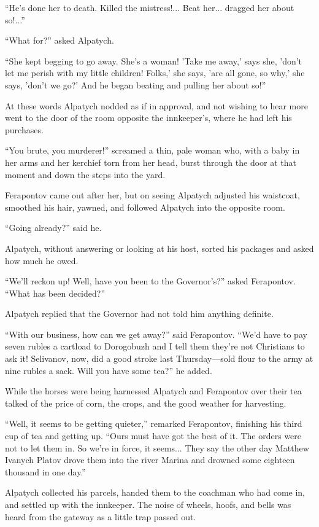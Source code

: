 ``He's done her to death. Killed the mistress!... Beat
her... dragged her about so!...''

``What for?'' asked Alpatych.

``She kept begging to go away. She's a woman! 'Take me away,'
says she, 'don't let me perish with my little children! Folks,'
she says, 'are all gone, so why,' she says, 'don't we go?' And he
began beating and pulling her about so!''

At these words Alpatych nodded as if in approval, and not wishing
to hear more went to the door of the room opposite the
innkeeper's, where he had left his purchases.

``You brute, you murderer!'' screamed a thin, pale woman who,
with a baby in her arms and her kerchief torn from her head,
burst through the door at that moment and down the steps into the
yard.

Ferapontov came out after her, but on seeing Alpatych adjusted
his waistcoat, smoothed his hair, yawned, and followed Alpatych
into the opposite room.

``Going already?'' said he.

Alpatych, without answering or looking at his host, sorted his
packages and asked how much he owed.

``We'll reckon up! Well, have you been to the Governor's?'' asked
Ferapontov. ``What has been decided?''

Alpatych replied that the Governor had not told him anything
definite.

``With our business, how can we get away?'' said
Ferapontov. ``We'd have to pay seven rubles a cartload to
Dorogobuzh and I tell them they're not Christians to ask it!
Selivanov, now, did a good stroke last Thursday---sold flour to
the army at nine rubles a sack. Will you have some tea?''  he
added.

While the horses were being harnessed Alpatych and Ferapontov
over their tea talked of the price of corn, the crops, and the
good weather for harvesting.

``Well, it seems to be getting quieter,'' remarked Ferapontov,
finishing his third cup of tea and getting up. ``Ours must have
got the best of it.  The orders were not to let them in. So we're
in force, it seems... They say the other day Matthew Ivanych
Platov drove them into the river Marina and drowned some eighteen
thousand in one day.''

Alpatych collected his parcels, handed them to the coachman who
had come in, and settled up with the innkeeper. The noise of
wheels, hoofs, and bells was heard from the gateway as a little
trap passed out.


